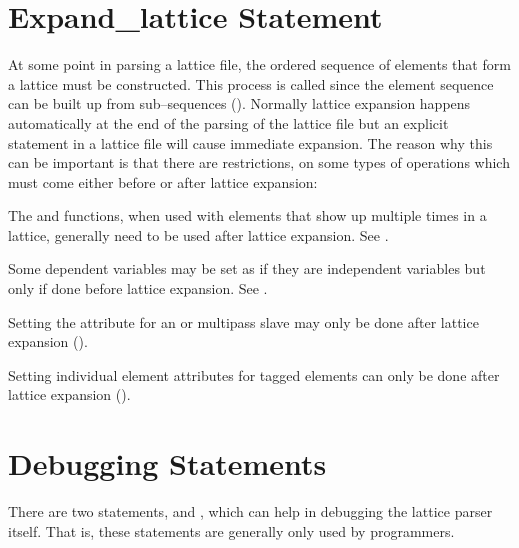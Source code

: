 \section{Expand_lattice Statement}
\label{s:expand}

At some point in parsing a lattice file, the ordered sequence of
elements that form a lattice must be constructed. This process is called
 since the element sequence can be built up from
sub--sequences (). Normally lattice expansion happens
automatically at the end of the parsing of the lattice file but an
explicit  statement in a lattice file will cause
immediate expansion. The reason why this can be important is that there
are restrictions, on some types of operations which must come either
before or after lattice expansion:
\begin{Itemize}
\item 
{}
The  and  functions, when used with elements
that show up multiple times in a lattice, generally need to be used
after lattice expansion. See .
\item 
Some dependent variables may be set as if they are independent
variables but only if done before lattice expansion. See .
\item 
Setting the  attribute for an 
 or  multipass
slave may only be done after lattice expansion ().
\item
{}
Setting individual element attributes for tagged elements can only be done
after lattice expansion ().
\end{Itemize}

\section{Debugging Statements}

There are two statements,  and ,
which can help in debugging the \bmad lattice parser
itself.  That is, these statements are generally only used by programmers.


